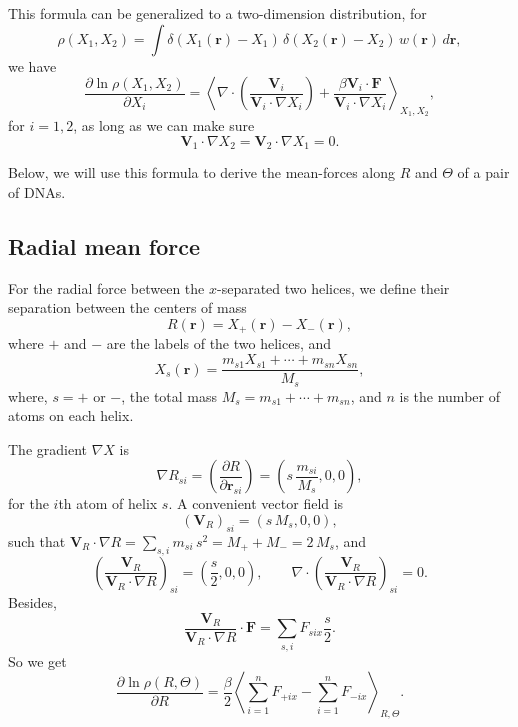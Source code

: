 \documentclass{article}
\begin{document}
This formula can be generalized to a two-dimension distribution,
for
$$
\rho(X_1, X_2)
=
\int
\delta(X_1(\mathbf r) - X_1) \,
\delta(X_2(\mathbf r) - X_2) \,
w(\mathbf r) \, d\mathbf r,
$$
we have
$$
\frac{ \partial \ln \rho(X_1, X_2) }
     { \partial X_i }
=
\left\langle
\nabla \cdot
  \left(
    \frac{ \mathbf V_i }
         { \mathbf V_i \cdot \nabla X_i }
  \right)
  +
  \frac{ \beta \mathbf V_i \cdot \mathbf F }
       { \mathbf V_i \cdot \nabla X_i }
\right\rangle_{X_1, X_2}
,
$$
for $i = 1, 2$, as long as we can make sure
\begin{equation}
\mathbf V_1 \cdot \nabla X_2
=
\mathbf V_2 \cdot \nabla X_1
= 0
.
\label{eq:ortho}
\end{equation}



Below, we will use this formula to derive
the mean-forces along $R$ and $\Theta$
of a pair of DNAs.


\subsection{Radial mean force}


For the radial force between the $x$-separated two helices,
we define their separation
between the centers of mass
$$
R(\mathbf r) = X_+(\mathbf r) - X_-(\mathbf r)
,
$$
where $+$ and $-$ are the labels of the two helices,
and
\begin{equation}
X_s(\mathbf r)
=
\frac{ m_{s1} X_{s1} + \cdots + m_{sn} X_{sn} }
     { M_s }
,
\label{eq:comx}
\end{equation}
where, $s = +$ or $-$,
the total mass $M_s = m_{s1} + \cdots +m_{sn}$,
and $n$ is the number of atoms on each helix.

The gradient $\nabla X$ is
$$
\nabla R_{si}
=
\left( \frac{ \partial R } { \partial \mathbf r_{si} } \right)
=
\left(
  s \, \frac{ m_{si} } { M_s } , 0, 0
\right)
,
$$
for the $i$th atom of helix $s$.
%
A convenient vector field is
\begin{equation}
  \left( \mathbf V_R \right)_{si}
  =
  (s \, M_s, 0, 0)
  ,
\end{equation}
such that
$\mathbf V_R \cdot \nabla R = \sum_{s, i} m_{si} \, s^2 = M_+ + M_- = 2 \, M_s$,
and
$$
  \left( \frac{ \mathbf V_R } { \mathbf V_R \cdot \nabla R } \right)_{si}
  =
  \left( \frac s 2, 0, 0 \right)
  ,
  \qquad
  \nabla \cdot
  \left( \frac{ \mathbf V_R } { \mathbf V_R \cdot \nabla R } \right)_{si}
  = 0.
$$
Besides,
$$
  \frac{ \mathbf V_R } { \mathbf V_R \cdot \nabla R } \cdot \mathbf F
  =
  \sum_{s, i} F_{six} \frac{ s } { 2 }
  .
$$
So we get
$$
\frac{ \partial \ln \rho(R, \Theta) }
     { \partial R }
=
\frac \beta 2
\left\langle
  \sum_{i = 1}^n F_{+ix}
  -
  \sum_{i = 1}^n F_{-ix}
\right\rangle_{R, \Theta}
.
$$
\end{document}

